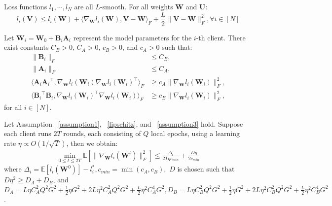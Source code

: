 \begin{assumption} \label{lipschitz}
    Loss functions ${l}_1, \cdots, {l}_N$ are all $L$-smooth. For all weights $\mathbf{W}$ and $\mathbf{U}$:
    \begin{equation}
        l_i(\mathbf{V}) \leq l_i(\mathbf{W}) + \langle \nabla_{\mathbf{W}} l_i(\mathbf{W}), \mathbf{V}-\mathbf{W} \rangle_F + \frac{L}{2} \|\mathbf{V}-\mathbf{W}\|_F^2, \forall i \in [N] \nonumber
    \end{equation}
    
\end{assumption}

\begin{assumption} \label{assumption3}
Let $\mathbf{W}_i=\mathbf{W}_0+\mathbf{B}_i\mathbf{A}_i$ represent the model parameters for the $i$-th client. There exist constants $C_B>0$, $C_A>0$, $c_B > 0$, and $c_A > 0$ such that:
\begin{equation*}
    \begin{aligned}
        \|\mathbf{B}_i\|_F &\leq C_B, \\
        \|\mathbf{A}_i\|_F &\leq C_A, \\
        \langle {\mathbf{A}_i}{\mathbf{A}_i}^\top, \nabla_{\mathbf{W}} {l}_i(\mathbf{W}_i)\nabla_{\mathbf{W}} {l}_i(\mathbf{W}_i)^{\top}\rangle_F &\geq c_A \|\nabla_{\mathbf{W}} {l}_i(\mathbf{W}_i)\|_F^2, \\
        \langle {\mathbf{B}_i}^{\top}\mathbf{B}_i, \nabla_{\mathbf{W}}{l}_i(\mathbf{W}_i)^{\top}\nabla_{\mathbf{W}} {l}_i(\mathbf{W}_i)\rangle_F & \geq c_B \|\nabla_{\mathbf{W}} {l}_i(\mathbf{W}_i)\|_F^2,
    \end{aligned}
\end{equation*}
for all $i\in[N]$.
\end{assumption}

\begin{theorem} \label{convergence-non-convex}
    Let Assumption ~\ref{assumption1}, ~\ref{lipschitz}, and ~\ref{assumption3} hold. Suppose each client runs $2T$ rounds, each consisting of $Q$ local epochs, using a learning rate $\eta \propto O(1/\sqrt{T})$, then we obtain:
    \begin{align}
        \min_{0\leq t\le 2T}  \mathbb{E}[\|\nabla_{\mathbf{W}}l_i(\mathbf{W}^{t})\|_F^2] \leq \frac{ \Delta_i}{2T\eta c_{min}} + \frac{D\eta}{2  c_{min}}
    \end{align}
    where $\Delta_i = \mathbb{E}[l_i(\mathbf{W}^{0})] -l_i^*, c_{min} = \min (c_A ,c_B), $ $D$ is chosen such that $ D \eta^2 \geq D_A+ D_B$, and $D_A = L \eta C_A^2 Q^2 G^2 + \frac{1}{2} \eta G^2 + 2L \eta^2 C_A^2 Q^2 G^2 + \frac{L}{2} \eta^2 C_A^4 G^2 ,
    D_B = L \eta C_B^2 Q^2 G^2 + \frac{1}{2} \eta G^2 + 2L \eta^2 C_B^2 Q^2 G^2 + \frac{L}{2} \eta^2 C_B^4 G^2$.
\end{theorem}


